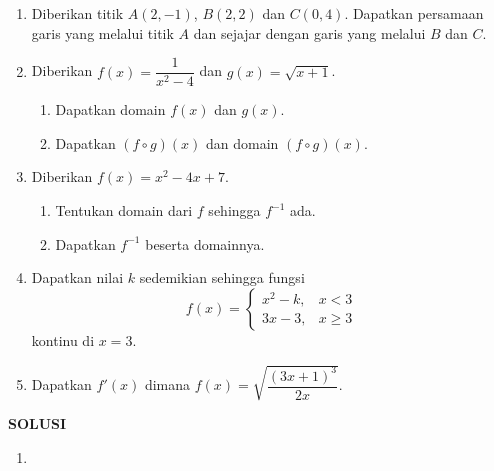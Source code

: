 \documentclass[11pt,openany,a4paper]{article}
\renewcommand{\headrulewidth}{0pt}
\begin{document}
\begin{enumerate}
    \item Diberikan titik $A(2,-1)$, $B(2,2)$ dan $C(0,4)$. Dapatkan persamaan garis yang melalui titik $A$ dan sejajar dengan garis yang melalui $B$ dan $C$.

    \item Diberikan $f(x) = \dfrac{1}{x^2 - 4}$ dan $g(x) = \sqrt{x+1}$.
          \begin{enumerate}
              \item Dapatkan domain $f(x)$ dan $g(x)$.
              \item Dapatkan $(f \circ g)(x)$ dan domain $(f \circ g)(x)$.
          \end{enumerate}

    \item Diberikan $f(x) = x^2 - 4x + 7$.
          \begin{enumerate}
              \item Tentukan domain dari $f$ sehingga $f^{-1}$ ada.
              \item Dapatkan $f^{-1}$ beserta domainnya.
          \end{enumerate}

    \item Dapatkan nilai $k$ sedemikian sehingga fungsi
          \[
              f(x) =
              \begin{cases}
                  x^2 - k, & x < 3    \\
                  3x - 3,  & x \geq 3
              \end{cases}
          \]
          kontinu di $x=3$.

    \item Dapatkan $f'(x)$ dimana
          $
              f(x) = \sqrt{\dfrac{(3x+1)^3}{2x}}.
          $

\end{enumerate}



\newpage
{}
{\centering\textbf{SOLUSI}}
\renewcommand{\arraystretch}{1.5}
\renewcommand{\headrulewidth}{1pt}
\begin{enumerate}
    \item
\end{enumerate}
\end{document}
